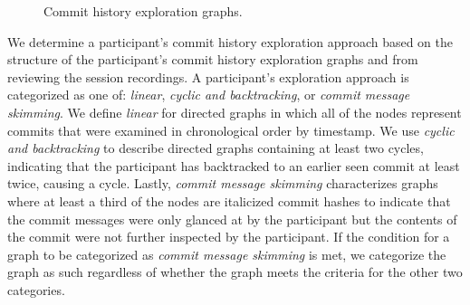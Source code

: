 \begin{figure}
  \centering%
  \qquad
  \caption{
    Commit history exploration graphs.
  }%
  \label{fig:Exploration-Graphs}%
\end{figure}

We determine a participant's commit history exploration approach based on the structure 
of the participant's commit history exploration graphs and from reviewing the session recordings.
A participant's exploration approach is categorized as one of:
\textit{linear}, \textit{cyclic and backtracking}, or \textit{commit message skimming}.
We define \textit{linear} for directed graphs in which all of the nodes represent commits 
that were examined in chronological order by timestamp. 
We use \textit{cyclic and backtracking} to describe directed graphs 
containing at least two cycles, indicating that the participant has backtracked to
an earlier seen commit at least twice, causing a cycle. 
Lastly, \textit{commit message skimming} characterizes graphs where 
at least a third of the nodes are italicized commit hashes to indicate
that the commit messages were only glanced at by the participant but the
contents of the commit were not further inspected by the participant.
If the condition for a graph to be categorized as \textit{commit message skimming} is met,
we categorize the graph as such regardless of whether the graph meets the criteria for the other two categories.


